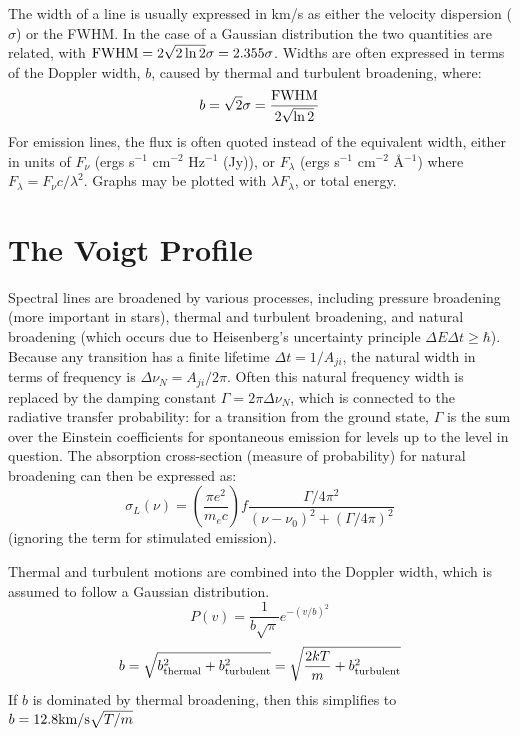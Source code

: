 The width of a line is usually expressed in km/s as either the velocity dispersion ($\sigma$) or the FWHM. In the case of a Gaussian distribution the two quantities are related, with ${\rm FWHM} = 2\sqrt{2\ln2}\sigma = 2.355\sigma$. Widths are often expressed in terms of the Doppler width, $b$, caused by thermal and turbulent broadening, where:
\begin{equation}
	b = \sqrt{2}\sigma = \frac{\rm FWHM}{2\sqrt{\ln2}}
\end{equation}
For emission lines, the flux is often quoted instead of the equivalent width, either in units of $F_{\nu}$ (ergs s$^{-1}$ cm$^{-2}$ Hz$^{-1}$ (Jy)), or $F_{\lambda}$ (ergs s$^{-1}$ cm$^{-2}$ \AA$^{-1}$) where $F_{\lambda} = F_{\nu} c/\lambda^2$. Graphs may be plotted with $\lambda F_{\lambda}$, or total energy.

\section{The Voigt Profile}

Spectral lines are broadened by various processes, including pressure broadening (more important in stars), thermal and turbulent broadening, and natural broadening (which occurs due to Heisenberg's uncertainty principle $\Delta E \Delta t \geq \hbar$). Because any transition has a finite lifetime $\Delta t = 1/A_{ji}$, the natural width in terms of frequency is $\Delta \nu_{N} = A_{ji}/2\pi$. Often this natural frequency width is replaced by the damping constant $\Gamma = 2 \pi \Delta \nu_{N}$, which is connected to the radiative transfer probability: for a transition from the ground state, $\Gamma$ is the sum over the Einstein coefficients for spontaneous emission for levels up to the level in question. The absorption cross-section (measure of probability) for natural broadening can then be expressed as:
\begin{equation}
	\sigma_L(\nu) = \left(\frac{\pi e^2}{m_e c}\right)f\frac{\Gamma/4 \pi^2}{(\nu - \nu_0)^2 + (\Gamma/4\pi)^2}
\end{equation}
(ignoring the term for stimulated emission).

Thermal and turbulent motions are combined into the Doppler width, which is assumed to follow a Gaussian distribution.
\begin{equation}
	P(v) = \frac{1}{b \sqrt{\pi}}e^{-(v/b)^2}
\end{equation}
\begin{equation}
	b = \sqrt{b^2_{\rm thermal} + b^2_{\rm turbulent}} = \sqrt{\frac{2kT}{m} + b^2_{\rm turbulent}}
\end{equation}
If $b$ is dominated by thermal broadening, then this simplifies to $b = 12.8 {\rm km/s} \sqrt{T/m}$

